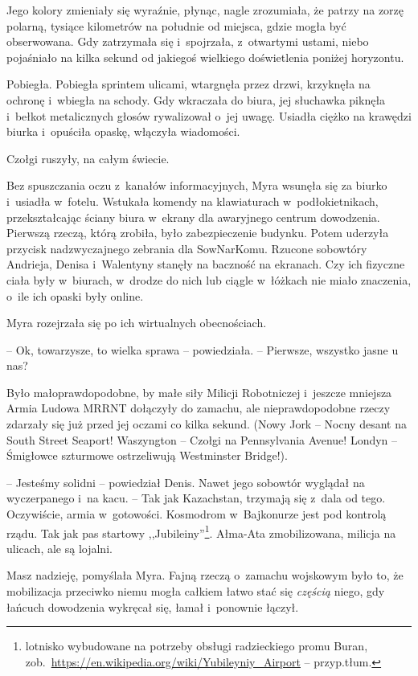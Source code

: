 \documentclass[oneside,polish,11pt,sfheadings]{mwbk}
\begin{document}
Jego kolory zmieniały się wyraźnie, płynąc, nagle zrozumiała, że patrzy
na zorzę polarną, tysiące kilometrów na południe od miejsca, gdzie mogła
być obserwowana. Gdy zatrzymała się i~spojrzała, z~otwartymi ustami,
niebo pojaśniało na kilka sekund od jakiegoś wielkiego doświetlenia
poniżej horyzontu.

Pobiegła. Pobiegła sprintem ulicami, wtargnęła przez drzwi, krzyknęła na
ochronę i~wbiegła na schody. Gdy wkraczała do biura, jej słuchawka
piknęła i~bełkot metalicznych głosów rywalizował o~jej uwagę. Usiadła
ciężko na krawędzi biurka i~opuściła opaskę, włączyła wiadomości.

Czołgi ruszyły, na całym świecie.

Bez spuszczania oczu z~kanałów informacyjnych, Myra wsunęła się za
biurko i~usiadła w~fotelu. Wstukała komendy na klawiaturach w~podłokietnikach, przekształcając ściany biura w~ekrany dla awaryjnego
centrum dowodzenia. Pierwszą rzeczą, którą zrobiła, było zabezpieczenie
budynku. Potem uderzyła przycisk nadzwyczajnego zebrania dla SowNarKomu.
Rzucone sobowtóry Andrieja, Denisa i~Walentyny stanęły na baczność na
ekranach. Czy ich fizyczne ciała były w~biurach, w~drodze do nich lub
ciągle w~łóżkach nie miało znaczenia, o~ile ich opaski były online.

Myra rozejrzała się po ich wirtualnych obecnościach.

-- Ok, towarzysze, to wielka sprawa -- powiedziała. -- Pierwsze, wszystko
jasne u nas?

Było małoprawdopodobne, by małe siły Milicji Robotniczej i~jeszcze
mniejsza Armia Ludowa MRRNT dołączyły do zamachu, ale nieprawdopodobne
rzeczy zdarzały się już przed jej oczami co kilka sekund. (Nowy Jork -- Nocny desant na South Street Seaport! Waszyngton -- Czołgi na
Pennsylvania Avenue! Londyn -- Śmigłowce szturmowe ostrzeliwują
Westminster Bridge!).

-- Jesteśmy solidni -- powiedział Denis. Nawet jego sobowtór wyglądał na
wyczerpanego i~na kacu. -- Tak jak Kazachstan, trzymają się z~dala od
tego. Oczywiście, armia w~gotowości. Kosmodrom w~Bajkonurze jest pod
kontrolą rządu. Tak jak pas startowy ,,Jubileiny''\footnote{ lotnisko
wybudowane na potrzeby obsługi radzieckiego promu Buran,
zob.~\url{https://en.wikipedia.org/wiki/Yubileyniy\_Airport} -- 
przyp.tłum.}. Ałma-Ata zmobilizowana, milicja na ulicach, ale są
lojalni.

Masz nadzieję, pomyślała Myra. Fajną rzeczą o~zamachu wojskowym było to,
że mobilizacja przeciwko niemu mogła całkiem łatwo stać się
\textit{częścią} niego, gdy łańcuch dowodzenia wykręcał się, łamał i~ponownie łączył.
\end{document}
